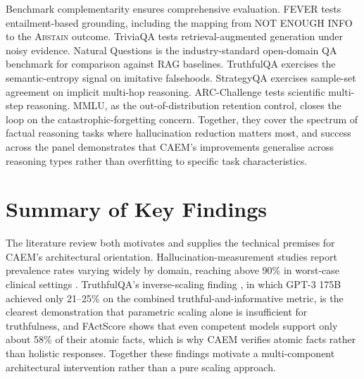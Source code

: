 Benchmark complementarity ensures comprehensive evaluation. FEVER tests entailment-based grounding, including the mapping from NOT ENOUGH INFO to the \textsc{Abstain} outcome. TriviaQA tests retrieval-augmented generation under noisy evidence. Natural Questions is the industry-standard open-domain QA benchmark for comparison against RAG baselines. TruthfulQA exercises the semantic-entropy signal on imitative falsehoods. StrategyQA exercises sample-set agreement on implicit multi-hop reasoning. ARC-Challenge tests scientific multi-step reasoning. MMLU, as the out-of-distribution retention control, closes the loop on the catastrophic-forgetting concern. Together, they cover the spectrum of factual reasoning tasks where hallucination reduction matters most, and success across the panel demonstrates that CAEM's improvements generalise across reasoning types rather than overfitting to specific task characteristics.

\section{Summary of Key Findings}

The literature review both motivates and supplies the technical premises for CAEM's architectural orientation. Hallucination-measurement studies report prevalence rates varying widely by domain, reaching above 90\% in worst-case clinical settings \cite{alkaissi2023artificial}. TruthfulQA's inverse-scaling finding \cite{lin-etal-2022-truthfulqa}, in which GPT-3 175B achieved only 21--25\% on the combined truthful-and-informative metric, is the clearest demonstration that parametric scaling alone is insufficient for truthfulness, and FActScore \cite{min-etal-2023-factscore} shows that even competent models support only about 58\% of their atomic facts, which is why CAEM verifies atomic facts rather than holistic responses. Together these findings motivate a multi-component architectural intervention rather than a pure scaling approach.

